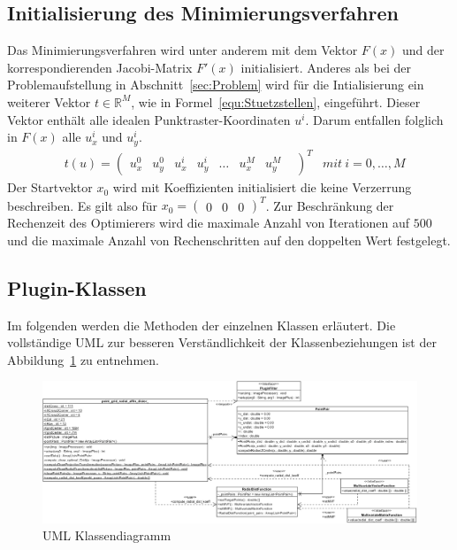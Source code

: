 \subsection{Initialisierung des Minimierungsverfahren}
\label{sec:Minimierung}
Das Minimierungsverfahren wird unter anderem mit dem Vektor $F(x)$ und der korrespondierenden Jacobi-Matrix $F'(x)$ initialisiert. Anderes als bei der Problemaufstellung in Abschnitt~\ref{sec:Problem} wird für die Intialisierung ein weiterer Vektor $t \in \mathbb{R}^M$, wie in Formel~\ref{equ:Stuetzstellen}, eingeführt. Dieser Vektor enthält alle idealen Punktraster-Koordinaten $u^i$. Darum entfallen folglich in $F(x)$ alle $u_x^i$ und $u_y^i$.
\begin{equation}
\label{equ:Stuetzstellen}
\begin{aligned}
&t(u)=
\begin{pmatrix}
u_x^0&
u_y^0&
u_x^i&
u_y^i&
\dots&
u_x^M&
u_y^M&
\end{pmatrix}^T
&mit\ i = 0,\dots,M
\end{aligned}
\end{equation}
Der Startvektor $x_0$ wird mit Koeffizienten initialisiert die keine Verzerrung beschreiben. Es gilt also für $x_0 = \begin{pmatrix}
0 & 0 & 0
\end{pmatrix}^T$. Zur Beschränkung der Rechenzeit des Optimierers wird die maximale Anzahl von Iterationen auf $500$ und die maximale Anzahl von Rechenschritten auf den doppelten Wert festgelegt.


\subsection{Plugin-Klassen}
\label{sec:PluginKlassen}

Im folgenden werden die Methoden der einzelnen Klassen erläutert. Die vollständige UML zur besseren Verständlichkeit der Klassenbeziehungen ist der Abbildung~\ref{img:UML} zu entnehmen.

\begin{figure} %
	\center
	\includegraphics[width=\textheight, angle =90]{Images/Class Diagram1.jpg}
	\caption{UML Klassendiagramm}
	\label{img:UML}
\end{figure}


